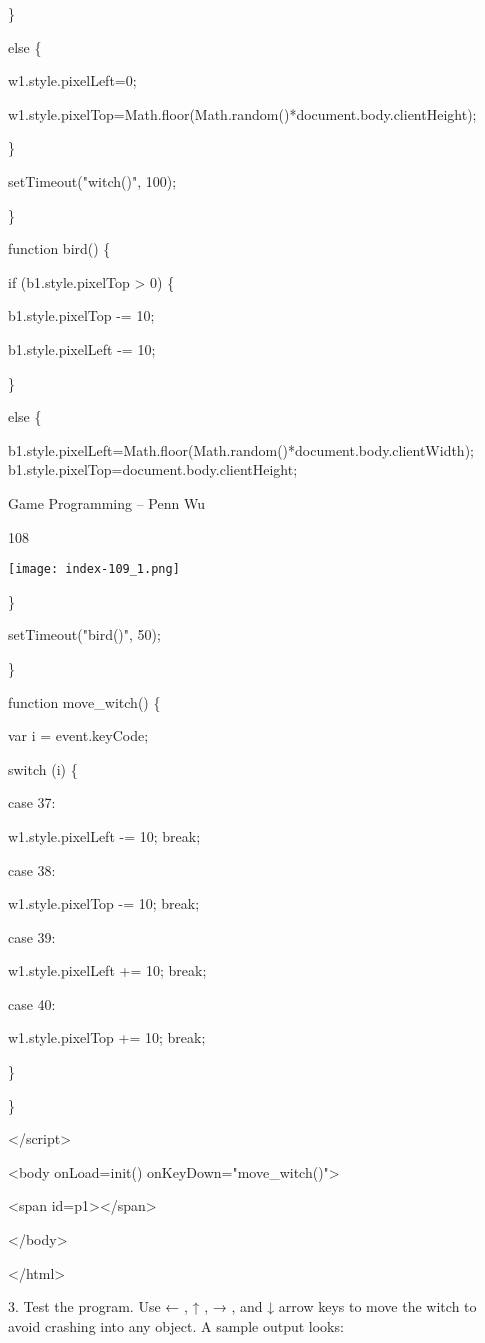 \documentclass[
]{article}
\begin{document}
\}

else \{

w1.style.pixelLeft=0;

w1.style.pixelTop=Math.floor(Math.random()*document.body.clientHeight);

\}

setTimeout("witch()", 100);

\}

function bird() \{

if (b1.style.pixelTop \textgreater{} 0) \{

b1.style.pixelTop -= 10;

b1.style.pixelLeft -= 10;

\}

else \{

b1.style.pixelLeft=Math.floor(Math.random()*document.body.clientWidth);
b1.style.pixelTop=document.body.clientHeight;

Game Programming -- Penn Wu

108

\protect\hypertarget{index_split_007.htmlux5cux23p109}{}{}\texttt{[image: index-109\_1.png]}

\}

setTimeout("bird()", 50);

\}

function move\_witch() \{

var i = event.keyCode;

switch (i) \{

case 37:

w1.style.pixelLeft -= 10; break;

case 38:

w1.style.pixelTop -= 10; break;

case 39:

w1.style.pixelLeft += 10; break;

case 40:

w1.style.pixelTop += 10; break;

\}

\}

\textless/script\textgreater{}

\textless body onLoad=init() onKeyDown="move\_witch()"\textgreater{}

\textless span id=p1\textgreater\textless/span\textgreater{}

\textless/body\textgreater{}

\textless/html\textgreater{}

3. Test the program. Use ← , ↑ , → , and ↓ arrow keys to move the witch
to avoid crashing into any object. A sample output looks:
\end{document}
